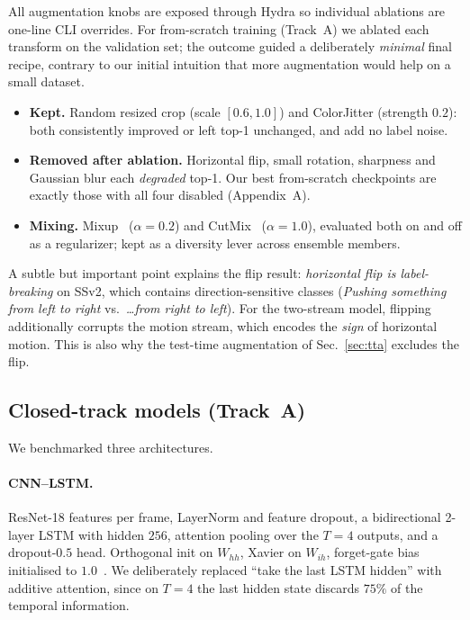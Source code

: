 \documentclass[10pt,twocolumn,letterpaper]{article}
\begin{document}
All augmentation knobs are exposed through Hydra so individual
ablations are one-line CLI overrides. For from-scratch training
(Track~A) we ablated each transform on the validation set; the outcome
guided a deliberately \emph{minimal} final recipe, contrary to our
initial intuition that more augmentation would help on a small dataset.

\begin{itemize}
    \item \textbf{Kept.} Random resized crop (scale $[0.6, 1.0]$) and
    ColorJitter (strength $0.2$): both consistently improved or left
    top-1 unchanged, and add no label noise.
    \item \textbf{Removed after ablation.} Horizontal flip, small
    rotation, sharpness and Gaussian blur each \emph{degraded} top-1.
    Our best from-scratch checkpoints are exactly those with all four
    disabled (Appendix~A).
    \item \textbf{Mixing.} Mixup~\cite{Zhang18mixup} ($\alpha=0.2$) and
    CutMix~\cite{Yun19cutmix} ($\alpha=1.0$), evaluated both on and off
    as a regularizer; kept as a diversity lever across ensemble members.
\end{itemize}

A subtle but important point explains the flip result:
\emph{horizontal flip is label-breaking} on SSv2, which contains
direction-sensitive classes (\textit{Pushing something from left to
right} vs.~\textit{\dots from right to left}). For the two-stream
model, flipping additionally corrupts the motion stream, which encodes
the \emph{sign} of horizontal motion. This is also why the test-time
augmentation of Sec.~\ref{sec:tta} excludes the flip.

\subsection{Closed-track models (Track~A)}
\label{sec:closed}

We benchmarked three architectures.

\paragraph{CNN--LSTM.} ResNet-18 features per frame, LayerNorm and
feature dropout, a bidirectional 2-layer LSTM with hidden $256$,
attention pooling over the $T=4$ outputs, and a dropout-$0.5$ head.
Orthogonal init on $W_{hh}$, Xavier on $W_{ih}$, forget-gate bias
initialised to $1.0$~\cite{Jozefowicz15}. We deliberately replaced
``take the last LSTM hidden'' with additive attention, since on $T=4$
the last hidden state discards $75\%$ of the temporal information.
\end{document}
